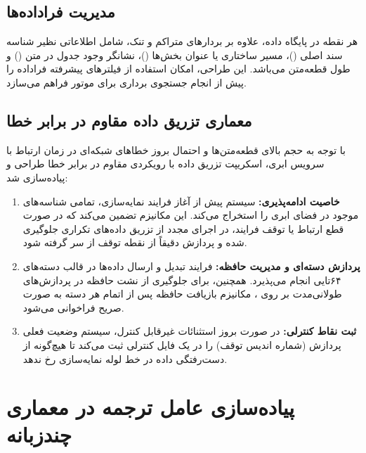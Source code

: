 \subsection{مدیریت فراداده‌ها}

هر نقطه در پایگاه داده، علاوه بر بردارهای متراکم و تنک، شامل اطلاعاتی نظیر شناسه سند اصلی ()، مسیر ساختاری یا عنوان بخش‌ها ()، نشانگر وجود جدول در متن () و طول قطعه‌متن می‌باشد. این طراحی، امکان استفاده از فیلترهای پیشرفته فراداده را پیش از انجام جستجوی برداری برای موتور  فراهم می‌سازد.

\subsection{معماری تزریق داده مقاوم در برابر خطا}

با توجه به حجم بالای قطعه‌متن‌ها و احتمال بروز خطاهای شبکه‌ای در زمان ارتباط با سرویس ابری، اسکریپت تزریق داده با رویکردی مقاوم در برابر خطا طراحی و پیاده‌سازی شد:

\begin{enumerate}

\item \textbf{خاصیت ادامه‌پذیری:} سیستم پیش از آغاز فرایند نمایه‌سازی، تمامی شناسه‌های موجود در فضای ابری را استخراج می‌کند. این مکانیزم تضمین می‌کند که در صورت قطع ارتباط یا توقف فرایند، در اجرای مجدد از تزریق داده‌های تکراری جلوگیری شده و پردازش دقیقاً از نقطه توقف از سر گرفته شود.

\item \textbf{پردازش دسته‌ای و مدیریت حافظه:} فرایند تبدیل و ارسال داده‌ها در قالب دسته‌های ۶۴تایی انجام می‌پذیرد. همچنین، برای جلوگیری از نشت حافظه در پردازش‌های طولانی‌مدت بر روی ، مکانیزم بازیافت حافظه پس از اتمام هر دسته به صورت صریح فراخوانی می‌شود.

\item \textbf{ثبت نقاط کنترلی:} در صورت بروز استثنائات غیرقابل کنترل، سیستم وضعیت فعلی پردازش (شماره اندیس توقف) را در یک فایل کنترلی ثبت می‌کند تا هیچ‌گونه از دست‌رفتگی داده در خط لوله نمایه‌سازی رخ ندهد.

\end{enumerate}

\section{پیاده‌سازی عامل ترجمه در معماری چندزبانه}

